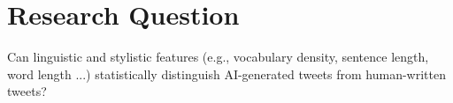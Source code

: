\section*{Research Question}

Can linguistic and stylistic features (e.g., vocabulary density, sentence length, word length ...) 
statistically distinguish AI-generated tweets from human-written tweets?
